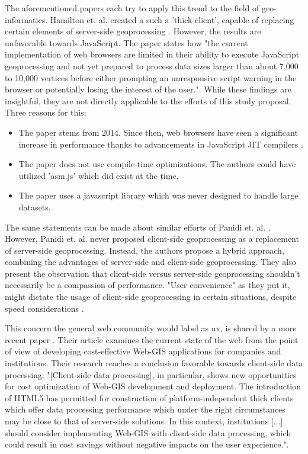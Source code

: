 The aforementioned papers each try to apply this trend to the field of geo-informatics. 
Hamilton et. al. created a such a 'thick-client', capable of replacing certain elements of server-side geoprocessing \cite{hamilton_client-side_2014}. 
However, the results are unfavorable towards JavaScript. 
The paper states how "the current implementation of web browsers are limited in their ability to execute JavaScript geoprocessing and not yet prepared to process data sizes larger than about 7,000 to 10,000 vertices before either prompting an unresponsive script warning in the browser or potentially losing the interest of the user.". While these findings are insightful, they are not directly applicable to the efforts of this study proposal. Three reasons for this:

\begin{itemize}
  \item The paper stems from 2014. Since then, web browsers have seen a significant increase in performance thanks to advancements in JavaScript JIT compilers \cite{haas_bringing_2017, kulawiak_analysis_2019}. 
  \item The paper does not use compile-time optimizations. The authors could have utilized 'asm.js' \cite{mozilla_asmjs_2013} which did exist at the time. 
  \item The paper uses a javascript library which was never designed to handle large datasets.
\end{itemize}

The same statements can be made about similar efforts of Panidi et. al. \cite{panidi_hybrid_2015}. 
However, Panidi et. al. never proposed client-side geoprocessing as a replacement of server-side geoprocessing. Instead, the authors propose a hybrid approach, combining the advantages of server-side and client-side geoprocessing. 
They also present the observation that client-side versus server-side geoprocessing shouldn't necessarily be a compassion of performance. 
"User convenience" as they put it, might dictate the usage of client-side geoprocessing in certain situations, despite speed considerations \cite{panidi_hybrid_2015}. 

This concern the general web community would label as \ac{ux}, is shared by a more recent paper \cite{kulawiak_analysis_2019}. 
Their article examines the current state of the web from the point of view of developing cost-effective Web-GIS applications for companies and institutions. 
Their research reaches a conclusion favorable towards client-side data processing: "[Client-side data processing], in particular, shows new opportunities for cost optimization of Web-GIS development and deployment. 
The introduction of HTML5 has permitted for construction of platform-independent thick clients which offer data processing performance which under the right circumstances may be close to that of server-side solutions. 
In this context, institutions [...] should consider implementing Web-GIS with client-side data processing, which could result in cost savings without negative impacts on the user experience.".

